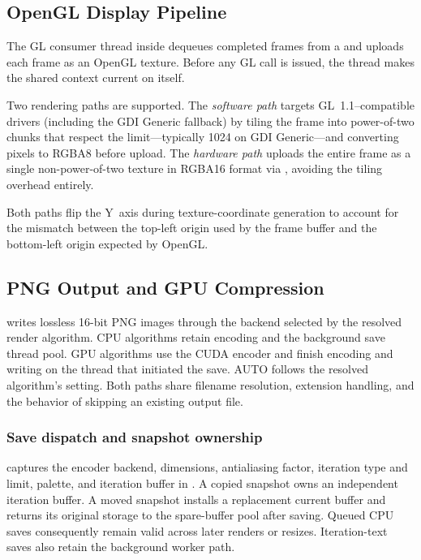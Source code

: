 \subsection{OpenGL Display Pipeline}
\label{subsec:opengl-display}

The GL consumer thread inside  dequeues completed
frames from a  and uploads each frame as an
OpenGL texture.  Before any GL call is issued, the thread makes the
shared context current on itself.

Two rendering paths are supported.  The \emph{software path} targets
GL~1.1--compatible drivers (including the GDI Generic fallback) by tiling
the frame into power-of-two chunks that respect the
 limit---typically 1024 on GDI Generic---and
converting  pixels to RGBA8 before upload.  The
\emph{hardware path} uploads the entire frame as a single
non-power-of-two texture in RGBA16 format via ,
avoiding the tiling overhead entirely.

Both paths flip the Y~axis during texture-coordinate generation to
account for the mismatch between the top-left origin used by the
frame buffer and the bottom-left origin expected by OpenGL.

\subsection{PNG Output and GPU Compression}
\label{subsec:png-output}

\FractalShark{} writes lossless 16-bit PNG images through the backend
selected by the resolved render algorithm. CPU algorithms retain
 encoding and the background save thread pool. GPU
algorithms use the CUDA encoder and finish encoding and writing on the
thread that initiated the save. AUTO follows the resolved algorithm's
 setting. Both paths share filename resolution,
extension handling, and the behavior of skipping an existing output file.

\subsubsection{Save dispatch and snapshot ownership}

 captures the encoder backend, dimensions,
antialiasing factor, iteration type and limit, palette, and iteration
buffer in . A copied snapshot owns an independent
iteration buffer. A moved snapshot installs a replacement current buffer
and returns its original storage to the spare-buffer pool after saving.
Queued CPU saves consequently remain valid across later renders or
resizes. Iteration-text saves also retain the background worker path.

